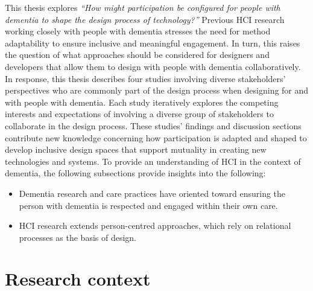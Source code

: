 This thesis explores \textit{``How might participation be configured for people with dementia to shape the design process of technology?''} Previous HCI research working closely with people with dementia stresses the need for method adaptability to ensure inclusive and meaningful engagement. In turn, this raises the question of what approaches should be considered for designers and developers that allow them to design with people with dementia collaboratively. In response, this thesis describes four studies involving diverse stakeholders' perspectives who are commonly part of the design process when designing for and with people with dementia. Each study iteratively explores the competing interests and expectations of involving a diverse group of stakeholders to collaborate in the design process. These studies' findings and discussion sections contribute new knowledge concerning how participation is adapted and shaped to develop inclusive design spaces that support mutuality in creating new technologies and systems. To provide an understanding of HCI in the context of dementia, the following subsections provide insights into the following:
\begin{itemize}
\item Dementia research and care practices have oriented toward ensuring the person with dementia is respected and engaged within their own care.

\item HCI research extends person-centred approaches, which rely on relational processes as the basis of design. 

\end{itemize}


\section{Research context}
\label{Intro: ResearchContext}

